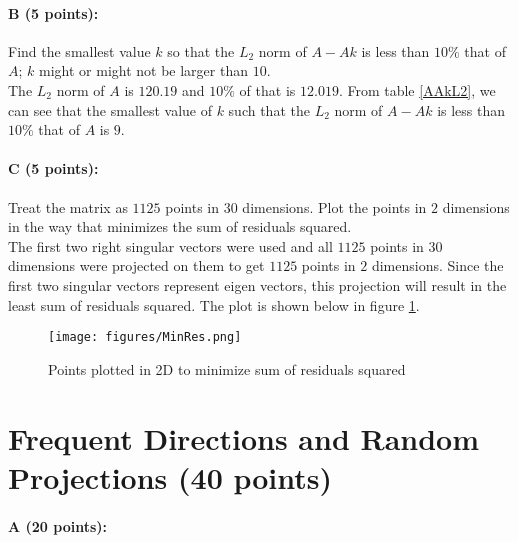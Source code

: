 \documentclass[11pt]{article}
\begin{document}
\paragraph{B (5 points):}
Find the smallest value $k$ so that the $L_2$ norm of $A-Ak$ is less than $10\%$ that of $A$; $k$ might or might not be larger than $10$.\\

The $L_2$ norm of $A$ is $120.19$ and $10\%$ of that is $12.019$. From table \ref{AAkL2}, we can see that the smallest value of $k$ such that the $L_2$ norm of $A-Ak$ is less than $10\%$ that of $A$ is $9$.

\paragraph{C (5 points):}

Treat the matrix as $1125$ points in $30$ dimensions. Plot the points in $2$ dimensions in the way that minimizes the sum of residuals squared.\\

The first two right singular vectors were used and all $1125$ points in $30$ dimensions were projected on them to get $1125$ points in $2$ dimensions. Since the first two singular vectors represent eigen vectors, this projection will result in the least sum of residuals squared. The plot is shown below in figure \ref{MinRes}.

\begin{figure}[!htb]
\centering
\texttt{[image: figures/MinRes.png]}
\caption{Points plotted in 2D to minimize sum of residuals squared}
\label{MinRes}
\end{figure} 

\section{Frequent Directions and Random Projections (40 points)}

\paragraph{A (20 points):}
\end{document}
